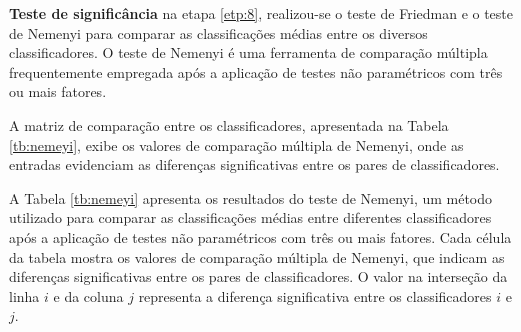 \textbf{Teste de signific\^ancia}
na etapa \ref{etp:8}, realizou-se o teste de Friedman e o teste de Nemenyi para comparar as classificações médias entre os diversos classificadores. O teste de Nemenyi é uma ferramenta de comparação múltipla frequentemente empregada após a aplicação de testes não paramétricos com três ou mais fatores.

A matriz de comparação entre os classificadores, apresentada na Tabela \ref{tb:nemeyi}, exibe os valores de comparação múltipla de Nemenyi, onde as entradas evidenciam as diferenças significativas entre os pares de classificadores.

A Tabela \ref{tb:nemeyi} apresenta os resultados do teste de Nemenyi, um método utilizado para comparar as classificações médias entre diferentes classificadores após a aplicação de testes não paramétricos com três ou mais fatores. Cada célula da tabela mostra os valores de comparação múltipla de Nemenyi, que indicam as diferenças significativas entre os pares de classificadores. O valor na interseção da linha $i$ e da coluna $j$ representa a diferença significativa entre os classificadores $i$ e $j$.

